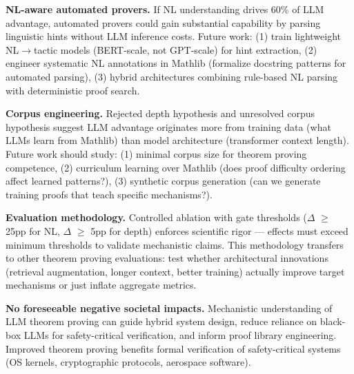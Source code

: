 \textbf{NL-aware automated provers.} If NL understanding drives 60\% of LLM advantage, automated provers could gain substantial capability by parsing linguistic hints without LLM inference costs. Future work: (1) train lightweight NL$\rightarrow$tactic models (BERT-scale, not GPT-scale) for hint extraction, (2) engineer systematic NL annotations in Mathlib (formalize docstring patterns for automated parsing), (3) hybrid architectures combining rule-based NL parsing with deterministic proof search.

\textbf{Corpus engineering.} Rejected depth hypothesis and unresolved corpus hypothesis suggest LLM advantage originates more from training data (what LLMs learn from Mathlib) than model architecture (transformer context length). Future work should study: (1) minimal corpus size for theorem proving competence, (2) curriculum learning over Mathlib (does proof difficulty ordering affect learned patterns?), (3) synthetic corpus generation (can we generate training proofs that teach specific mechanisms?).

\textbf{Evaluation methodology.} Controlled ablation with gate thresholds ($\Delta$ $\geq$ 25pp for NL, $\Delta$ $\geq$ 5pp for depth) enforces scientific rigor --- effects must exceed minimum thresholds to validate mechanistic claims. This methodology transfers to other theorem proving evaluations: test whether architectural innovations (retrieval augmentation, longer context, better training) actually improve target mechanisms or just inflate aggregate metrics.

\textbf{No foreseeable negative societal impacts.} Mechanistic understanding of LLM theorem proving can guide hybrid system design, reduce reliance on black-box LLMs for safety-critical verification, and inform proof library engineering. Improved theorem proving benefits formal verification of safety-critical systems (OS kernels, cryptographic protocols, aerospace software).
